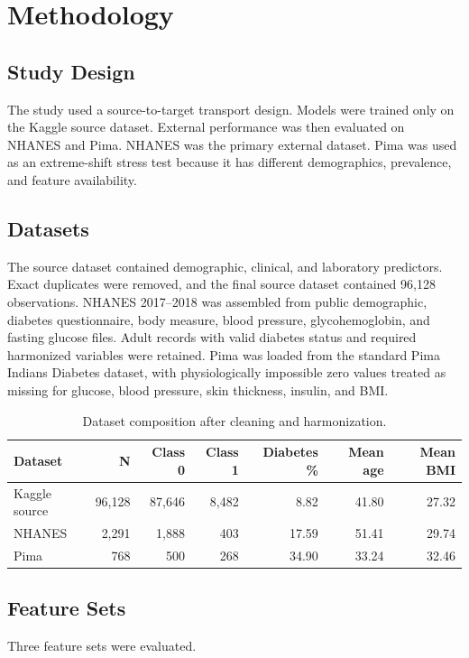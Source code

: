 \documentclass[11pt]{article}
\begin{document}
\section{Methodology}
\subsection{Study Design}
The study used a source-to-target transport design. Models were trained only on the Kaggle source dataset. External performance was then evaluated on NHANES and Pima. NHANES was the primary external dataset. Pima was used as an extreme-shift stress test because it has different demographics, prevalence, and feature availability.

\subsection{Datasets}
The source dataset contained demographic, clinical, and laboratory predictors. Exact duplicates were removed, and the final source dataset contained 96,128 observations. NHANES 2017--2018 was assembled from public demographic, diabetes questionnaire, body measure, blood pressure, glycohemoglobin, and fasting glucose files. Adult records with valid diabetes status and required harmonized variables were retained. Pima was loaded from the standard Pima Indians Diabetes dataset, with physiologically impossible zero values treated as missing for glucose, blood pressure, skin thickness, insulin, and BMI.

\begin{table}[H]
\centering
\caption{Dataset composition after cleaning and harmonization.}
\label{tab:dataset}
\begin{tabular}{lrrrrrr}
\toprule
Dataset & N & Class 0 & Class 1 & Diabetes \% & Mean age & Mean BMI \\
\midrule
Kaggle source & 96,128 & 87,646 & 8,482 & 8.82 & 41.80 & 27.32 \\
NHANES & 2,291 & 1,888 & 403 & 17.59 & 51.41 & 29.74 \\
Pima & 768 & 500 & 268 & 34.90 & 33.24 & 32.46 \\
\bottomrule
\end{tabular}
\end{table}

\subsection{Feature Sets}
Three feature sets were evaluated.
\end{document}

